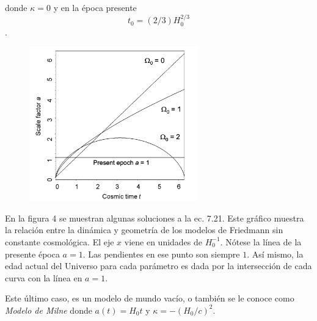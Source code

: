 \documentclass[11pt]{article}
\begin{document}
{\begin{itemize}
    donde $\kappa = 0$ y en la época presente $$t_0 = (2/3) H_0^{2/3}$$.
    
    \end{itemize}

 
    
    
    \begin{figure}               \includegraphics[width=0.65\textwidth]{grafica_scale_factor_timepp219Malcolm.png}
        \caption{}%
    \end{figure}
    
    
       En la figura 4 se muestran algunas soluciones a la ec. 7.21. Este gráfico muestra la relación entre la dinámica y geometría de los modelos de Friedmann sin constante cosmológica. El eje $x$ viene en unidades de $H_0^{-1}$. Nótese la línea de la presente época $a=1$.  Las pendientes en ese punto son siempre $1$. Así mismo, la edad actual del Universo para cada parámetro es dada por la intersección de cada curva con la línea en $a=1$. 
    

    
    Este último caso, es un modelo de mundo vacío, o también se le conoce como {\textit{Modelo de Milne}} donde $a(t) = H_0 t$ y $\kappa = - (H_0/c)^2$. 
    
    
    \newpage
    
}
\end{document}
